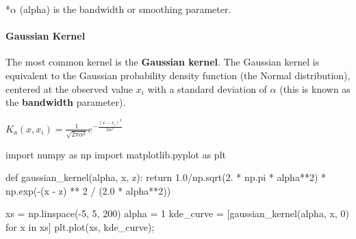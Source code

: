 \documentclass[
  letterpaper,
  DIV=11,
  numbers=noendperiod]{scrreprt}
\let\oldparagraph\paragraph
\renewcommand{\paragraph}[1]{\oldparagraph{#1}\mbox{}}
\newenvironment{Shaded}{\begin{snugshade}}{\end{snugshade}}
\newcommand{\ControlFlowTok}[1]{\textcolor[rgb]{0.00,0.23,0.31}{#1}}
\newcommand{\DecValTok}[1]{\textcolor[rgb]{0.68,0.00,0.00}{#1}}
\newcommand{\FloatTok}[1]{\textcolor[rgb]{0.68,0.00,0.00}{#1}}
\newcommand{\ImportTok}[1]{\textcolor[rgb]{0.00,0.46,0.62}{#1}}
\newcommand{\KeywordTok}[1]{\textcolor[rgb]{0.00,0.23,0.31}{#1}}
\newcommand{\NormalTok}[1]{\textcolor[rgb]{0.00,0.23,0.31}{#1}}
\newcommand{\OperatorTok}[1]{\textcolor[rgb]{0.37,0.37,0.37}{#1}}
\begin{document}
*\(\alpha\) (alpha) is the bandwidth or smoothing parameter.

\hypertarget{gaussian-kernel}{%
\paragraph{Gaussian Kernel}\label{gaussian-kernel}}

The most common kernel is the \textbf{Gaussian kernel}. The Gaussian
kernel is equivalent to the Gaussian probability density function (the
Normal distribution), centered at the observed value \(x_i\) with a
standard deviation of \(\alpha\) (this is known as the
\textbf{bandwidth} parameter).

\(K_a(x, x_i) = \frac{1}{\sqrt{2\pi\alpha^{2}}}e^{-\frac{(x-x_i)^{2}}{2\alpha^{2}}}\)

\begin{Shaded}
\begin{Highlighting}[]
\ImportTok{import}\NormalTok{ numpy }\ImportTok{as}\NormalTok{ np}
\ImportTok{import}\NormalTok{ matplotlib.pyplot }\ImportTok{as}\NormalTok{ plt }

\KeywordTok{def}\NormalTok{ gaussian\_kernel(alpha, x, z):}
    \ControlFlowTok{return} \FloatTok{1.0}\OperatorTok{/}\NormalTok{np.sqrt(}\FloatTok{2.} \OperatorTok{*}\NormalTok{ np.pi }\OperatorTok{*}\NormalTok{ alpha}\OperatorTok{**}\DecValTok{2}\NormalTok{) }\OperatorTok{*}\NormalTok{ np.exp(}\OperatorTok{{-}}\NormalTok{(x }\OperatorTok{{-}}\NormalTok{ z) }\OperatorTok{**} \DecValTok{2} \OperatorTok{/}\NormalTok{ (}\FloatTok{2.0} \OperatorTok{*}\NormalTok{ alpha}\OperatorTok{**}\DecValTok{2}\NormalTok{))}

\NormalTok{xs }\OperatorTok{=}\NormalTok{ np.linspace(}\OperatorTok{{-}}\DecValTok{5}\NormalTok{, }\DecValTok{5}\NormalTok{, }\DecValTok{200}\NormalTok{)}
\NormalTok{alpha }\OperatorTok{=} \DecValTok{1}
\NormalTok{kde\_curve }\OperatorTok{=}\NormalTok{ [gaussian\_kernel(alpha, x, }\DecValTok{0}\NormalTok{) }\ControlFlowTok{for}\NormalTok{ x }\KeywordTok{in}\NormalTok{ xs]}
\NormalTok{plt.plot(xs, kde\_curve)}\OperatorTok{;}
\end{Highlighting}
\end{Shaded}
\end{document}
